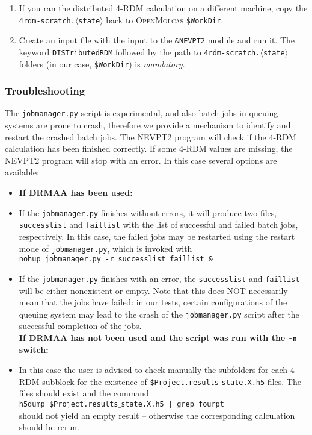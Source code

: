 \documentclass[bibliography=totoc,12pt,a4paper]{scrartcl}
\newcommand{\mol}{\textsc{OpenMolcas}}
\newcommand{\kwd}[1]{\texttt{#1}}
\begin{document}
\begin{enumerate}
 \item If you ran the distributed 4-RDM calculation on a different machine, copy the \kwd{4rdm-scratch.$\langle$state$\rangle$} back to \mol{} \kwd{\$WorkDir}.
 \item Create an input file with the input to the \kwd{\&NEVPT2} module and run it. The keyword \kwd{DISTributedRDM} followed by the path to \kwd{4rdm-scratch.$\langle$state$\rangle$} folders (in our case, \kwd{\$WorkDir}) is \emph{mandatory}.
\end{enumerate}

\subsubsection{Troubleshooting}
The \kwd{jobmanager.py} script is experimental, and also batch jobs in queuing systems are prone to crash, therefore we provide a mechanism to identify and restart the crashed batch jobs. The NEVPT2 program will check if the 4-RDM calculation has been finished correctly. If some 4-RDM values are missing, the NEVPT2 program will stop with an error. In this case several options are available:
\begin{itemize}
 \item[] \textbf{If DRMAA has been used:}
 \item If the \kwd{jobmanager.py} finishes without errors, it will produce two files, \kwd{successlist} and \kwd{faillist} with the list of successful and failed batch jobs, respectively. In this case, the failed jobs may be restarted using the restart mode of \kwd{jobmanager.py}, which is invoked with\\
 \kwd{nohup jobmanager.py -r successlist faillist \&}\label{item:jobm-restart}
 \item If the \kwd{jobmanager.py} finishes with an error, the \kwd{successlist} and \kwd{faillist} will be either nonexistent or empty. Note that this does NOT necessarily mean that the jobs have failed: in our tests, certain configurations of the queuing system may lead to the crash of the \kwd{jobmanager.py} script after the successful completion of the jobs.\\

 \textbf{If DRMAA has not been used and the script was run with the \texttt{-n} switch:}\\
 \item In this case the user is advised to check manually the subfolders for each 4-RDM subblock for the existence of \texttt{\$Project.results$\_$state.X.h5} files. The files should exist and the command\\
 \kwd{h5dump \$Project.results$\_$state.X.h5 | grep fourpt}\\
 should not yield an empty result -- otherwise the corresponding calculation should be rerun.
\end{itemize}
\end{document}
